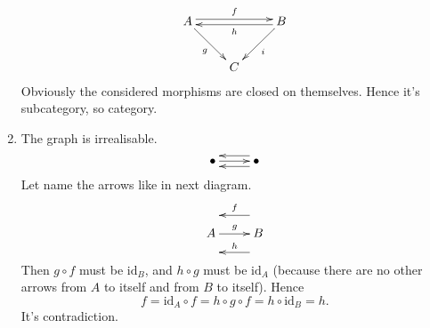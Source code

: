 \documentclass[12pt,a4paper]{article}
\newcommand{\id}{\mathrm{id}}
\begin{document}
\begin{problem}{1}
\begin{enumerate}
                \[
                    \xymatrix{
                        A \ar@<0.5ex>[rr]^{f} \ar[rd]_{g} && B \ar@<0.5ex>[ll]^{h} \ar[ld]^{i} \\
                        & C
                    }
                \]
                Obviously the considered morphisms are closed on themselves. Hence it's subcategory, so category.
            \item The graph is irrealisable.
                \[
                    \xymatrix{
                        \bullet \ar[r] & \bullet \ar@<1ex>[l] \ar@<-1ex>[l]
                    }
                \]
                Let name the arrows like in next diagram.
                \[
                    \xymatrix{
                        A \ar[r]^{g} & B \ar@<15pt>[l]_{h} \ar@<-15pt>[l]_{f}
                    }
                \]
                Then $g \circ f$ must be $\id_B$, and $h \circ g$ must be $\id_A$ (because there are no other arrows from $A$ to itself and from $B$ to itself). Hence
                \[f = \id_A \circ f = h \circ g \circ f = h \circ \id_B = h.\]
                It's contradiction.
        \end{enumerate}
    \end{problem}
\end{document}
